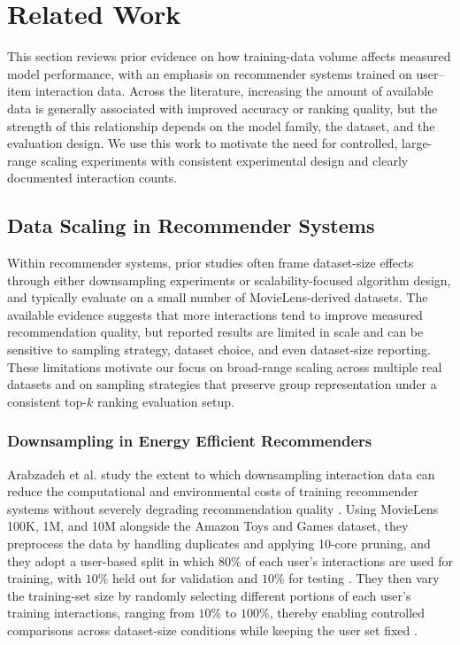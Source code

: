 \documentclass[12pt,a4paper]{article}
\begin{document}
\section{Related Work}
This section reviews prior evidence on how training-data volume affects measured model performance, with an emphasis on recommender systems trained on user--item interaction data. Across the literature, increasing the amount of available data is generally associated with improved accuracy or ranking quality, but the strength of this relationship depends on the model family, the dataset, and the evaluation design. We use this work to motivate the need for controlled, large-range scaling experiments with consistent experimental design and clearly documented interaction counts.

\subsection{Data Scaling in Recommender Systems}
Within recommender systems, prior studies often frame dataset-size effects through either downsampling experiments or scalability-focused algorithm design, and typically evaluate on a small number of MovieLens-derived datasets. The available evidence suggests that more interactions tend to improve measured recommendation quality, but reported results are limited in scale and can be sensitive to sampling strategy, dataset choice, and even dataset-size reporting. These limitations motivate our focus on broad-range scaling across multiple real datasets and on sampling strategies that preserve group representation under a consistent top-$k$ ranking evaluation setup.

\subsubsection{Downsampling in Energy Efficient Recommenders}
Arabzadeh et al. study the extent to which downsampling interaction data can reduce the computational and environmental costs of training recommender systems without severely degrading recommendation quality \cite{arabzadeh2025}. Using MovieLens 100K, 1M, and 10M alongside the Amazon Toys and Games dataset, they preprocess the data by handling duplicates and applying 10-core pruning, and they adopt a user-based split in which $80\%$ of each user’s interactions are used for training, with $10\%$ held out for validation and $10\%$ for testing \cite{arabzadeh2025}. They then vary the training-set size by randomly selecting different portions of each user’s training interactions, ranging from $10\%$ to $100\%$, thereby enabling controlled comparisons across dataset-size conditions while keeping the user set fixed \cite{arabzadeh2025}.
\end{document}
